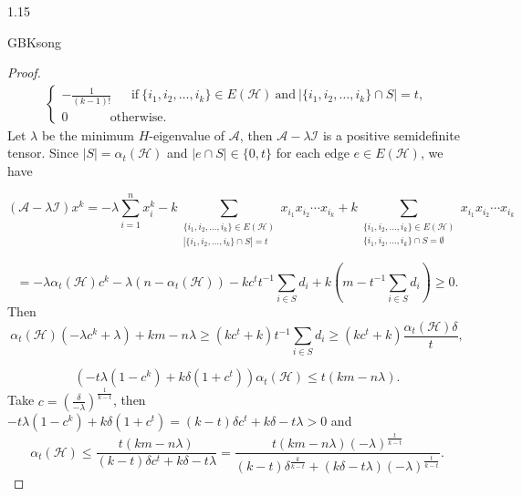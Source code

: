 \documentclass[preprint,12pt]{elsarticle}
\begin{document}
\begin{spacing}{1.15}
\begin{CJK*}{GBK}{song}
\begin{proof}
\begin{eqnarray*}
\begin{cases}
-\frac{1}{(k-1)!}~~~~~~~\mbox{if}~\{i_1,i_2,\ldots,i_k\}\in E(\mathcal{H})~\mbox{and}~|\{i_1,i_2,\ldots,i_k\}\cap S|=t,\\
0~~~~~~~~~~~~~~~\mbox{otherwise}.\end{cases}
\end{eqnarray*}
Let $\lambda$ be the minimum $H$-eigenvalue of $\mathcal{A}$, then $\mathcal{A}-\lambda \mathcal{I}$ is a positive semidefinite tensor. Since $|S|=\alpha_t(\mathcal{H})$ and $|e\cap S|\in\{0,t\}$ for each edge $e\in E(\mathcal{H})$, we have

\[( {\mathcal{A}}-\lambda \mathcal{I} )x^k = -\lambda\sum_{i=1}^nx_i^k-k
 \sum_{\substack{\{i_1,i_2,\ldots,i_k\}\in E(\mathcal{H})\\ |\{i_1,i_2,\ldots,i_k\}\cap S|=t}}
{{x_{{i_1}}}{x_{{i_2}}} \cdots {x_{{i_k}}}}  +k
\sum_{\substack{\{i_1,i_2,\ldots,i_k\} \in E(\mathcal{H})\\ \{i_1,i_2,\ldots,i_k\} \cap S = \emptyset}} {{x_{{i_1}}}{x_{{i_2}}} \cdots {x_{{i_k}}}} \]


\[= - {\lambda} \alpha_{t}(\mathcal{H}) {c^k} - \lambda (n - {\alpha_{t}}(\mathcal{H}) ) - kc^tt^{-1}\sum_{i\in S}d_i+ k\left( {m - t^{-1}\sum_{i\in S}d_i}\right) \geqslant 0.\]
Then
\[{\alpha _t}(\mathcal{H})\left( {-\lambda {c^k} + \lambda } \right) + km -n \lambda  \geqslant \left( {k{c^t} + k} \right)t^{-1}\sum_{i\in S}d_i \geqslant \left( {k{c^t} + k} \right)\frac{{{\alpha _t}(\mathcal{H})\delta }}{t},\]

\[\left( {-t \lambda \left( {1 - {c^k}} \right) + k \delta \left( {1 + {c^t}} \right)} \right){\alpha _t}(\mathcal{H})\leq t\left( {km - n\lambda } \right).\]
Take $c = {{\left( \frac{\delta }{-\lambda } \right)}^{\frac{1}{k-t}}}$, then
$ -t \lambda \left( {1 - {c}^k} \right) + k \delta \left( {1 + {c}^t} \right) = \left( {k - t} \right)\delta {c}^t + k \delta - t \lambda  > 0$ and
\[{\alpha _t}(\mathcal{H}) \leqslant \frac{{t\left( {km - n \lambda } \right)}}{{\left( {k - t} \right)\delta {c^t} + k \delta  - t \lambda }}=\frac{{t\left( {km - n \lambda } \right){{\left( { - \lambda } \right)}^{\frac{t}{{k - t}}}}}}{{\left( {k - t} \right){\delta ^{\frac{k}{{k - t}}}} + \left( {k \delta  - t\lambda } \right){{\left( { - \lambda } \right)}^{\frac{t}{{k - t}}}}}}.\]
\end{proof}


\end{CJK*}
\end{spacing}
\end{document}
